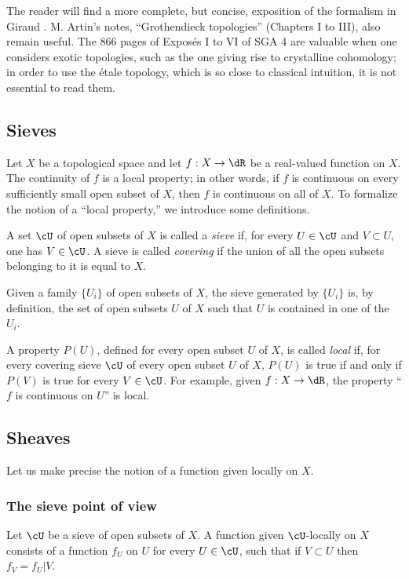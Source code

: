 The reader will find a more complete, but concise, exposition of the
formalism in Giraud \cite{gi64}. M. Artin's notes, “Grothendieck
topologies” \cite{ar62} (Chapters I to III), also remain useful. The
866 pages of Exposés I to VI of SGA 4 are valuable when one considers exotic
topologies, such as the one giving rise to crystalline cohomology; in order
to use the étale topology, which is so close to classical intuition, it is
not essential to read them.

\subsection{Sieves}\label{I:1-1}

Let $X$ be a topological space and let $f:X\to \dR$ be a real-valued
function on $X$. The continuity of $f$ is a local property; in other words,
if $f$ is continuous on every sufficiently small open subset of $X$, then
$f$ is continuous on all of $X$. To formalize the notion of a “local
property,” we introduce some definitions.

A set $\cU$ of open subsets of $X$ is called a \emph{sieve} if, for every
$U\in\cU$ and $V\subset U$, one has $V\in\cU$. A sieve is called
\emph{covering} if the union of all the open subsets belonging to it is
equal to $X$.

Given a family $\{U_i\}$ of open subsets of $X$, the sieve generated by
$\{U_i\}$ is, by definition, the set of open subsets $U$ of $X$ such that
$U$ is contained in one of the $U_i$.

A property $P(U)$, defined for every open subset $U$ of $X$, is called
\emph{local} if, for every covering sieve $\cU$ of every open subset $U$
of $X$, $P(U)$ is true if and only if $P(V)$ is true for every
$V\in \cU$. For example, given $f:X\to \dR$, the property “$f$ is
continuous on $U$” is local.

\subsection{Sheaves}\label{I:1-2}

Let us make precise the notion of a function given locally on $X$.

\subsubsection{The sieve point of view}\label{I:1-2-1}

Let $\cU$ be a sieve of open subsets of $X$. A function given
$\cU$-locally on $X$ consists of a function $f_U$ on $U$ for every
$U\in \cU$, such that if $V\subset U$ then $f_V=f_U|V$.

